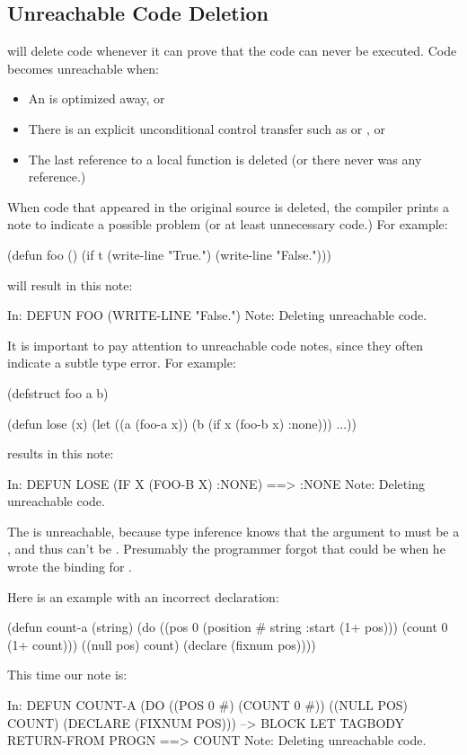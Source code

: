 \subsection{Unreachable Code Deletion}
\label{dead-code-notes}

\python{} will delete code whenever it can prove that the code can never be
executed.  Code becomes unreachable when:

\begin{itemize}
\item
An  is optimized away, or

\item
There is an explicit unconditional control transfer such as  or
, or

\item
The last reference to a local function is deleted (or there never was any
reference.)
\end{itemize}

When code that appeared in the original source is deleted, the compiler prints
a note to indicate a possible problem (or at least unnecessary code.)  For
example:
\begin{lisp}
(defun foo ()
  (if t
      (write-line "True.")
      (write-line "False.")))
\end{lisp}
will result in this note:
\begin{example}
In: DEFUN FOO
  (WRITE-LINE "False.")
Note: Deleting unreachable code.
\end{example}

It is important to pay attention to unreachable code notes, since they often
indicate a subtle type error.  For example:
\begin{example}
(defstruct foo a b)

(defun lose (x)
  (let ((a (foo-a x))
        (b (if x (foo-b x) :none)))
    ...))
\end{example}
results in this note:
\begin{example}
In: DEFUN LOSE
  (IF X (FOO-B X) :NONE)
==>
  :NONE
Note: Deleting unreachable code.
\end{example}
The  is unreachable, because type inference knows that the argument
to  must be a , and thus can't be \false.  Presumably the
programmer forgot that  could be \false{} when he wrote the binding for
.

Here is an example with an incorrect declaration:
\begin{lisp}
(defun count-a (string)
  (do ((pos 0 (position # string :start (1+ pos)))
       (count 0 (1+ count)))
      ((null pos) count)
    (declare (fixnum pos))))
\end{lisp}
This time our note is:
\begin{example}
In: DEFUN COUNT-A
  (DO ((POS 0 #) (COUNT 0 #))
      ((NULL POS) COUNT)
    (DECLARE (FIXNUM POS)))
--> BLOCK LET TAGBODY RETURN-FROM PROGN 
==>
  COUNT
Note: Deleting unreachable code.
\end{example}

